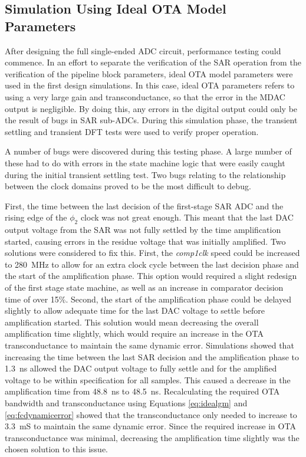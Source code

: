 \subsection{Simulation Using Ideal OTA Model Parameters}
After designing the full single-ended ADC circuit, performance testing could commence. In an effort to separate the verification of the SAR operation from the verification of the pipeline block parameters, ideal OTA model parameters were used in the first design simulations. In this case, ideal OTA parameters refers to using a very large gain and transconductance, so that the error in the MDAC output is negligible. By doing this, any errors in the digital output could only be the result of bugs in SAR sub-ADCs. During this simulation phase, the transient settling and transient DFT tests were used to verify proper operation.

A number of bugs were discovered during this testing phase. A large number of these had to do with errors in the state machine logic that were easily caught during the initial transient settling test. Two bugs relating to the relationship between the clock domains proved to be the most difficult to debug. 

First, the time between the last decision of the first-stage SAR ADC and the rising edge of the $\phi_{2}$ clock was not great enough. This meant that the last DAC output voltage from the SAR was not fully settled by the time amplification started, causing errors in the residue voltage that was initially amplified. Two solutions were considered to fix this. First, the \emph{comp1clk} speed could be increased to \SI{280}{\mega\hertz} to allow for an extra clock cycle between the last decision phase and the start of the amplification phase. This option would required a slight redesign of the first stage state machine, as well as an increase in comparator decision time of over 15\%. Second, the start of the amplification phase could be delayed slightly to allow adequate time for the last DAC voltage to settle before amplification started. This solution would mean decreasing the overall amplification time slightly, which would require an increase in the OTA transconductance to maintain the same dynamic error. Simulations showed that increasing the time between the last SAR decision and the amplification phase to \SI{1.3}{\nano\second} allowed the DAC output voltage to fully settle and for the amplified voltage to be within specification for all samples. This caused a decrease in the amplification time from \SI{48.8}{\nano\second} to \SI{48.5}{\nano\second}. Recalculating the required OTA bandwidth and transconductance using Equations \ref{eq:idealgm} and \ref{eq:fcdynamicerror} showed that the transconductance only needed to increase to \SI{3.3}{\milli\siemens} to maintain the same dynamic error. Since the required increase in OTA transconductance was minimal, decreasing the amplification time slightly was the chosen solution to this issue. 

